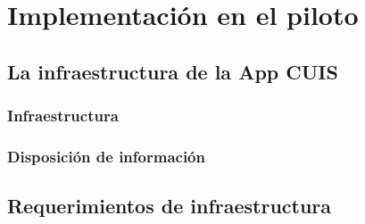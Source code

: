 \chapter{Implementación en el piloto}
\label{chap:implementacion}
\section*{La infraestructura de la App CUIS}
\subsection*{Infraestructura}
\subsection*{Disposición de información}
\section*{Requerimientos de infraestructura}
